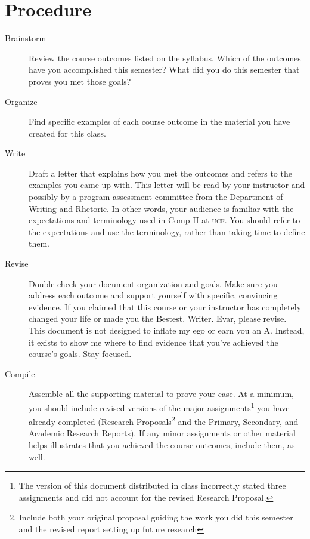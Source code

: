 \documentclass[9pt,twocolumn,oneside]{amsart}	%
\begin{document}
\section{Procedure} %
\label{sec:procedure}
\begin{description}
	\item[Brainstorm] Review the course outcomes listed on the syllabus. Which of the outcomes have you accomplished this semester? What did you do this semester that proves you met those goals?
	\item[Organize] Find specific examples of each course outcome in the material you have created for this class.
	\item[Write] Draft a letter that explains how you met the outcomes and refers to the examples you came up with. This letter will be read by your instructor and possibly by a program assessment committee from the Department of Writing and Rhetoric. In other words, your audience is familiar with the expectations and terminology used in Comp II at \textsc{ucf}. You should refer to the expectations and use the terminology, rather than taking time to define them.
	\item[Revise] Double-check your document organization and goals. Make sure you address each outcome and support yourself with specific, convincing evidence. If you claimed that this course or your instructor has completely changed your life or made you the Bestest. Writer. Evar\texttrademark{}, please revise. This document is not designed to inflate my ego or earn you an A. Instead, it exists to show me where to find evidence that you've achieved the course's goals. Stay focused.
	\item[Compile] Assemble all the supporting material to prove your case. At a minimum, you should include revised versions of the major assignments\footnote{The version of this document distributed in class incorrectly stated three assignments and did not account for the revised Research Proposal.} you have already completed (Research Proposals\footnote{Include both your original proposal guiding the work you did this semester and the revised report setting up future research} and the Primary, Secondary, and Academic Research Reports). If any minor assignments or other material helps illustrates that you achieved the course outcomes, include them, as well.
\end{description}
\end{document}
